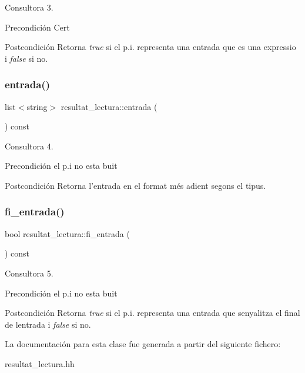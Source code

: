 Consultora 3. 

\begin{DoxyPrecond}{Precondición}
Cert 
\end{DoxyPrecond}
\begin{DoxyPostcond}{Postcondición}
Retorna {\itshape true} si el p.\+i. representa una entrada que es una expressio i {\itshape false} si no. 
\end{DoxyPostcond}
\hypertarget{classresultat__lectura_a2b6b1c0d200ea75619f7ad50600551c6}{}\label{classresultat__lectura_a2b6b1c0d200ea75619f7ad50600551c6} 
\subsubsection{\texorpdfstring{entrada()}{entrada()}}
{\footnotesize\ttfamily list$<$string$>$ resultat\+\_\+lectura\+::entrada (\begin{DoxyParamCaption}{ }\end{DoxyParamCaption}) const}



Consultora 4. 

\begin{DoxyPrecond}{Precondición}
el p.\+i no esta buit 
\end{DoxyPrecond}
\begin{DoxyPostcond}{Postcondición}
Retorna l’entrada en el format més adient segons el tipus. 
\end{DoxyPostcond}
\hypertarget{classresultat__lectura_a178d0aae65fbce754ec5d99a04732bf0}{}\label{classresultat__lectura_a178d0aae65fbce754ec5d99a04732bf0} 
\subsubsection{\texorpdfstring{fi\+\_\+entrada()}{fi\_entrada()}}
{\footnotesize\ttfamily bool resultat\+\_\+lectura\+::fi\+\_\+entrada (\begin{DoxyParamCaption}{ }\end{DoxyParamCaption}) const}



Consultora 5. 

\begin{DoxyPrecond}{Precondición}
el p.\+i no esta buit 
\end{DoxyPrecond}
\begin{DoxyPostcond}{Postcondición}
Retorna {\itshape true} si el p.\+i. representa una entrada que senyalitza el final de l\textquotesingle{}entrada i {\itshape false} si no. 
\end{DoxyPostcond}


La documentación para esta clase fue generada a partir del siguiente fichero\+:\begin{DoxyCompactItemize}
\item 
resultat\+\_\+lectura.\+hh\end{DoxyCompactItemize}
